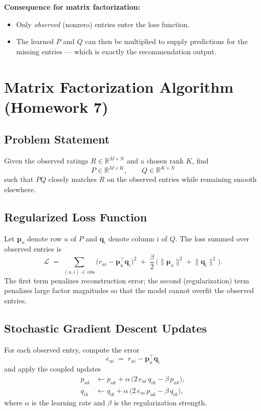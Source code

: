 \documentclass[11pt]{article}
\begin{document}
\textbf{Consequence for matrix factorization:}
\begin{itemize}
    \item Only \emph{observed} (nonzero) entries enter the loss function.
    \item The learned $P$ and $Q$ can then be multiplied to supply predictions for the missing entries --- which is exactly the recommendation output.
\end{itemize}


\section{Matrix Factorization Algorithm (Homework 7)}

\subsection{Problem Statement}
Given the observed ratings $R \in \mathbb{R}^{M \times N}$ and a chosen rank $K$, find
\[
    P \in \mathbb{R}^{M \times K}, \qquad Q \in \mathbb{R}^{K \times N}
\]
such that $P Q$ closely matches $R$ on the observed entries while remaining smooth elsewhere.

\subsection{Regularized Loss Function}
Let $\mathbf{p}_u$ denote row $u$ of $P$ and $\mathbf{q}_i$ denote column $i$ of $Q$. The loss summed over observed entries is
\begin{equation}
    \mathcal{L} \;=\; \sum_{(u,i)\,\in\,\text{obs}}
        \Big( r_{ui} - \mathbf{p}_u^{\top}\mathbf{q}_i \Big)^{2}
        \;+\; \frac{\beta}{2}\,\Big( \lVert \mathbf{p}_u \rVert^{2} + \lVert \mathbf{q}_i \rVert^{2} \Big).
\end{equation}
The first term penalizes reconstruction error; the second (regularization) term penalizes large factor magnitudes so that the model cannot overfit the observed entries.

\subsection{Stochastic Gradient Descent Updates}
For each observed entry, compute the error
\begin{equation}
    e_{ui} \;=\; r_{ui} - \mathbf{p}_u^{\top}\mathbf{q}_i
\end{equation}
and apply the coupled updates
\begin{align}
    p_{uk} &\leftarrow p_{uk} + \alpha\,\bigl(2\,e_{ui}\,q_{ik} - \beta\,p_{uk}\bigr),\\
    q_{ik} &\leftarrow q_{ik} + \alpha\,\bigl(2\,e_{ui}\,p_{uk} - \beta\,q_{ik}\bigr),
\end{align}
where $\alpha$ is the learning rate and $\beta$ is the regularization strength.
\end{document}
